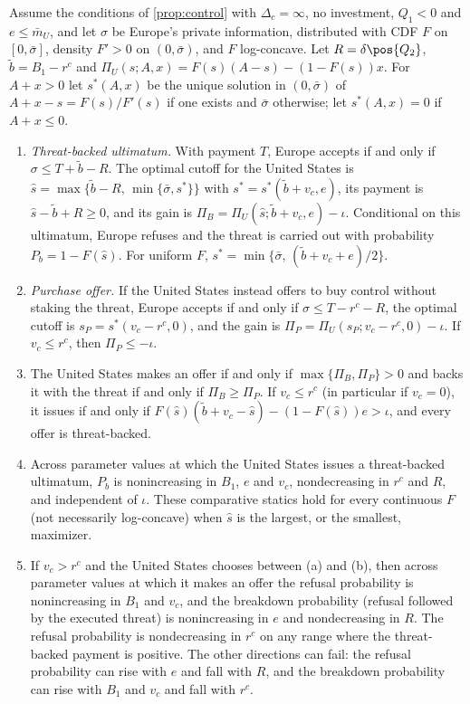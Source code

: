 \begin{proposition}[Breakdown]\label{prop:breakdown}
Assume the conditions of \cref{prop:control} with $\Delta_c=\infty$, no investment, $Q_1<0$ and $e\le\bar m_U$, and let $\sigma$ be Europe's private information, distributed with CDF $F$ on $[0,\bar\sigma]$, density $F'>0$ on $(0,\bar\sigma)$, and $F$ log-concave. Let $R=\delta\pos{Q_2}$, $\tilde b=B_1-r^c$ and $\Pi_U(s;A,x)=F(s)(A-s)-(1-F(s))x$. For $A+x>0$ let $s^*(A,x)$ be the unique solution in $(0,\bar\sigma)$ of $A+x-s=F(s)/F'(s)$ if one exists and $\bar\sigma$ otherwise; let $s^*(A,x)=0$ if $A+x\le 0$.
\begin{enumerate}[label=(\alph*)]
\item \emph{Threat-backed ultimatum.} With payment $T$, Europe accepts if and only if $\sigma\le T+\tilde b-R$. The optimal cutoff for the United States is $\hat s=\max\{\tilde b-R,\,\min\{\bar\sigma,s^*\}\}$ with $s^*=s^*(\tilde b+v_c,e)$, its payment is $\hat s-\tilde b+R\ge 0$, and its gain is $\Pi_B=\Pi_U(\hat s;\tilde b+v_c,e)-\iota$. Conditional on this ultimatum, Europe refuses and the threat is carried out with probability $P_b=1-F(\hat s)$. For uniform $F$, $s^*=\min\{\bar\sigma,\,(\tilde b+v_c+e)/2\}$.
\item \emph{Purchase offer.} If the United States instead offers to buy control without staking the threat, Europe accepts if and only if $\sigma\le T-r^c-R$, the optimal cutoff is $s_P=s^*(v_c-r^c,0)$, and the gain is $\Pi_P=\Pi_U(s_P;v_c-r^c,0)-\iota$. If $v_c\le r^c$, then $\Pi_P\le -\iota$.
\item The United States makes an offer if and only if $\max\{\Pi_B,\Pi_P\}>0$ and backs it with the threat if and only if $\Pi_B\ge\Pi_P$. If $v_c\le r^c$ (in particular if $v_c=0$), it issues if and only if $F(\hat s)(\tilde b+v_c-\hat s)-(1-F(\hat s))e>\iota$, and every offer is threat-backed.
\item Across parameter values at which the United States issues a threat-backed ultimatum, $P_b$ is nonincreasing in $B_1$, $e$ and $v_c$, nondecreasing in $r^c$ and $R$, and independent of $\iota$. These comparative statics hold for every continuous $F$ (not necessarily log-concave) when $\hat s$ is the largest, or the smallest, maximizer.
\item If $v_c>r^c$ and the United States chooses between (a) and (b), then across parameter values at which it makes an offer the refusal probability is nonincreasing in $B_1$ and $v_c$, and the breakdown probability (refusal followed by the executed threat) is nonincreasing in $e$ and nondecreasing in $R$. The refusal probability is nondecreasing in $r^c$ on any range where the threat-backed payment is positive. The other directions can fail: the refusal probability can rise with $e$ and fall with $R$, and the breakdown probability can rise with $B_1$ and $v_c$ and fall with $r^c$.
\end{enumerate}
\end{proposition}

